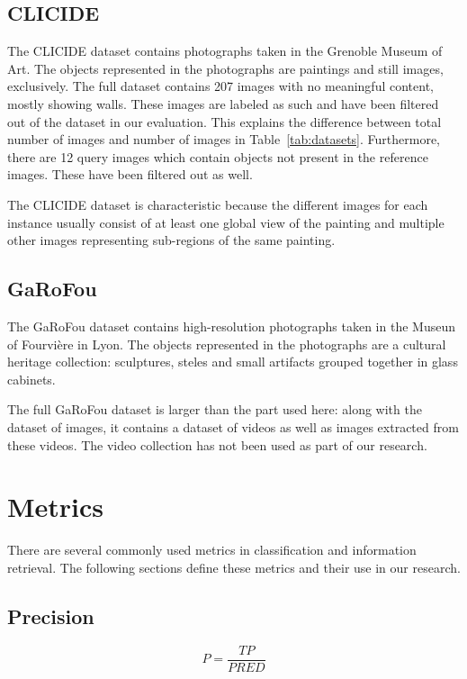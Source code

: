 \subsection{CLICIDE}
The CLICIDE dataset contains photographs taken in the Grenoble Museum of Art.
The objects represented in the photographs are paintings and still images,
exclusively. The full dataset contains 207 images with no meaningful content,
mostly showing walls. These images are labeled as such and have been filtered
out of the dataset in our evaluation. This explains the difference between
total number of images and number of images in Table~\ref{tab:datasets}.
Furthermore, there are 12 query images which contain objects not
present in the reference images. These have been filtered out as well.

The CLICIDE dataset is characteristic because the different images
for each instance usually consist of at least one global view of the
painting and multiple other images representing sub-regions of the
same painting.

\subsection{GaRoFou}
The GaRoFou dataset contains high-resolution photographs taken in the
Museun of Fourvière in Lyon. The objects represented in the photographs
are a cultural heritage collection: sculptures, steles and small artifacts
grouped together in glass cabinets.

The full GaRoFou dataset is larger than the part used here: along with
the dataset of images, it contains a dataset of videos as well as images
extracted from these videos. The video collection has not been used as
part of our research.

\section{Metrics}
There are several commonly used metrics in classification and information
retrieval. The following sections define these metrics and their use
in our research.

\subsection{Precision}\label{sec:precision}
\begin{equation}\label{eq:preccls}
P = \frac{TP}{PRED}
\end{equation}

